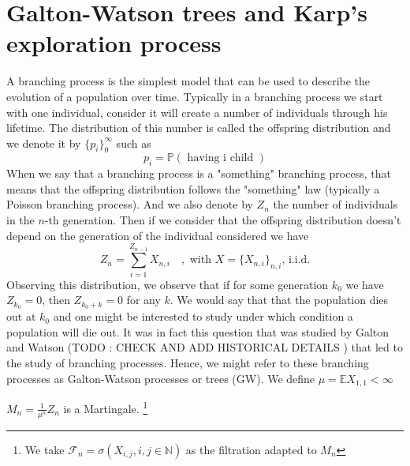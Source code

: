 \section{Galton-Watson trees and Karp's exploration process}
A branching process is the simplest model that can be used to describe the evolution of a population over time.
Typically in a branching process we start with one individual, consider it will create a number of individuals through his lifetime. 
The distribution of this number is called the offspring distribution and we denote it by $\{p_i\}_0^{\infty}$ such as
\begin{equation}
	p_i = \mathbb{P}(\text{ having i child })
\end{equation}
When we say that a branching process is a "something" branching process, that means that the offspring distribution follows the "something" law (typically a Poisson branching process).
And we also denote by $Z_n$ the number of individuals in the $n$-th generation. 
Then if we consider that the offspring distribution doesn't depend on the generation of the individual considered we have
\begin{equation}
	Z_n = \sum_{i=1}^{Z_{n-1}}X_{n, i} \quad, \text{ with } X = \{X_{n,i}\}_{n,i} \text{,  i.i.d.}
\end{equation}
Observing this distribution, we observe that if for some generation $k_0$ we have $Z_{k_0} = 0$, then $Z_{k_0 + k} = 0$ for any $k$. We would say that that the population dies out at $k_0$ and one might be interested to study under which condition a population will die out.
It was in fact this question that was studied by Galton and Watson (TODO : CHECK AND ADD HISTORICAL DETAILS ) that led to the study of branching processes. 
Hence, we might refer to these branching processes as Galton-Watson processes or trees (GW).
\newline
We define $\mu = \mathbb{E} X_{1,1} < \infty$
\begin{lemma}\label{martinGW}
	$M_n = \frac{1}{\mu^n}Z_n$ is a Martingale. 
	\footnote{We take $\mathcal{F}_n = \sigma(X_{i,j} , i,j \in \mathbb{N})$ as the filtration adapted to $M_n$ }
\end{lemma}
